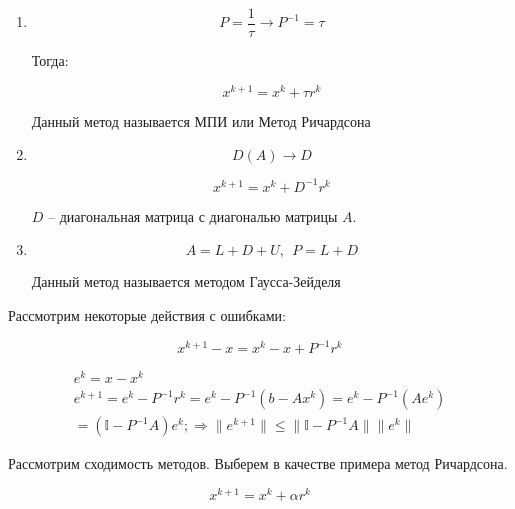 \documentclass[10pt,a4paper]{article}
\begin{document}
		\begin{enumerate}
			\item
			\begin{equation}
				P = \frac{1}{\tau} \rightarrow P^{-1} = \tau
			\end{equation}
			
			Тогда:
			
			\begin{equation}
				x^{k + 1} = x^{k} + \tau r^{k}
			\end{equation}
			
			Данный метод называется МПИ или Метод Ричардсона
			\item 
			\begin{equation}
				D\left(A\right) \rightarrow D
			\end{equation}
			
			\begin{equation}
				x^{k + 1} = x^{k} + D^{-1}r^{k}
			\end{equation}
			
			$D$ -- диагональная матрица с диагональю матрицы $A$.
			
			\item 
			\begin{equation}
				A = L + D + U,  \ \ P = L + D				
			\end{equation}
						
			Данный метод называется методом Гаусса-Зейделя
		\end{enumerate}
		
		Рассмотрим некоторые действия с ошибками:
		
		\begin{equation}
			x^{k + 1} - x = x^{k} - x + P^{-1}r^{k}
		\end{equation}
		
		\begin{eqnarray}
			e^{k} = x - x^{k}\\
			e^{k + 1} = e^{k} - P^{-1}r^{k} = e^{k} - 
			P^{-1}\left(b - Ax^{k}\right) = e^{k} - P^{-1}\left(Ae^{k}\right)\\
			=\left(\mathbb{I} - P^{-1}A\right)e^{k}; \Rightarrow 
			\parallel e^{k + 1} \parallel \leqslant \parallel 
			\mathbb{I} - P^{-1}A\parallel \parallel e^{k}\parallel
		\end{eqnarray}
		
		Рассмотрим сходимость методов. Выберем в качестве примера метод 
		Ричардсона.
		
		\begin{equation}
			x^{k + 1} = x^{k} + \alpha r^{k}
		\end{equation}
		
\end{document}
